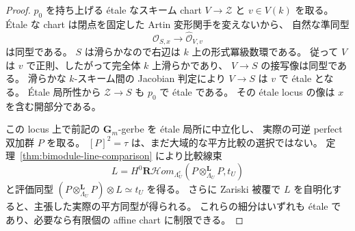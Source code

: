 \begin{proof}
$p_0$ を持ち上げる \'etale なスキーム chart $V\to\mathcal Z$ と
$v\in V(k)$ を取る。\'Etale な chart は閉点を固定した Artin 変形関手を変えないから、
自然な準同型
\[
 \widehat{\mathcal O}_{S,x}\longrightarrow
 \widehat{\mathcal O}_{V,v}
\]
は同型である。
$S$ は滑らかなので右辺は $k$ 上の形式冪級数環である。
従って $V$ は $v$ で正則、したがって完全体 $k$ 上滑らかであり、
$V\to S$ の接写像は同型である。
滑らかな $k$-スキーム間の Jacobian 判定により $V\to S$ は $v$ で \'etale となる。
\'Etale 局所性から $\mathcal Z\to S$ も $p_0$ で \'etale である。
その \'etale locus の像は $x$ を含む開部分である。

この locus 上で前記の $\mathbf G_m$-gerbe を \'etale 局所に中立化し、
実際の可逆 perfect 双加群 $P$ を取る。
$[P]^2=\tau$ は、まだ大域的な平方比較の選択ではない。
定理~\ref{thm:bimodule-line-comparison} により比較線束
\[
 L=H^0\mathbf R\mathcal Hom_{\Lambda_U^e}
       (P\otimes^{\mathbf L}_{\Lambda_U}P,t_U)
\]
と評価同型
$(P\otimes^{\mathbf L}_{\Lambda_U}P)\otimes L\simeq t_U$ を得る。
さらに Zariski 被覆で $L$ を自明化すると、主張した実際の平方同型が得られる。
これらの細分はいずれも \'etale であり、必要なら有限個の affine chart に制限できる。
\end{proof}

